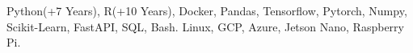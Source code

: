 
\begin{cvparagraph}
Python(+7 Years), R(+10 Years), Docker, Pandas, Tensorflow, Pytorch, Numpy, Scikit-Learn, FastAPI, SQL, Bash. Linux, GCP, Azure, Jetson Nano, Raspberry Pi.

\end{cvparagraph}
